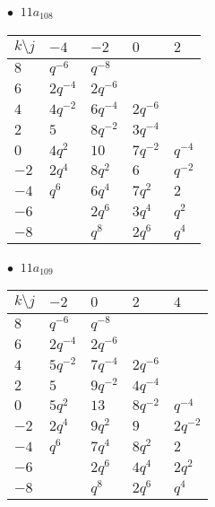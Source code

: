 \begin{minipage}{\linewidth}
$\bullet\ $ $11a_{108}$ \vspace{0.5em} \\
\begin{tabular}{l|llll}
$k \setminus j$ & $-4$ & $-2$ & $0$ & $2$ \\
\hline
$8$ & $q^{-6}$ & $q^{-8}$ &  &  \\
$6$ & $2q^{-4}$ & $2q^{-6}$ &  &  \\
$4$ & $4q^{-2}$ & $6q^{-4}$ & $2q^{-6}$ &  \\
$2$ & $5$ & $8q^{-2}$ & $3q^{-4}$ &  \\
$0$ & $4q^{2}$ & $10$ & $7q^{-2}$ & $q^{-4}$ \\
$-2$ & $2q^{4}$ & $8q^{2}$ & $6$ & $q^{-2}$ \\
$-4$ & $q^{6}$ & $6q^{4}$ & $7q^{2}$ & $2$ \\
$-6$ &  & $2q^{6}$ & $3q^{4}$ & $q^{2}$ \\
$-8$ &  & $q^{8}$ & $2q^{6}$ & $q^{4}$ \\
\end{tabular}
\vspace{2em}
\end{minipage}
%
\begin{minipage}{\linewidth}
$\bullet\ $ $11a_{109}$ \vspace{0.5em} \\
\begin{tabular}{l|llll}
$k \setminus j$ & $-2$ & $0$ & $2$ & $4$ \\
\hline
$8$ & $q^{-6}$ & $q^{-8}$ &  &  \\
$6$ & $2q^{-4}$ & $2q^{-6}$ &  &  \\
$4$ & $5q^{-2}$ & $7q^{-4}$ & $2q^{-6}$ &  \\
$2$ & $5$ & $9q^{-2}$ & $4q^{-4}$ &  \\
$0$ & $5q^{2}$ & $13$ & $8q^{-2}$ & $q^{-4}$ \\
$-2$ & $2q^{4}$ & $9q^{2}$ & $9$ & $2q^{-2}$ \\
$-4$ & $q^{6}$ & $7q^{4}$ & $8q^{2}$ & $2$ \\
$-6$ &  & $2q^{6}$ & $4q^{4}$ & $2q^{2}$ \\
$-8$ &  & $q^{8}$ & $2q^{6}$ & $q^{4}$ \\
\end{tabular}
\vspace{2em}
\end{minipage}
%
